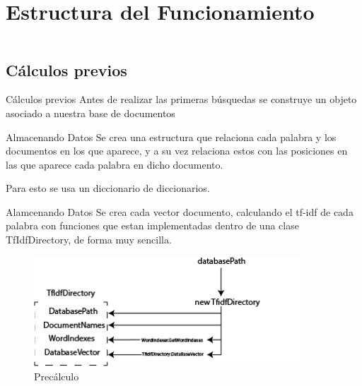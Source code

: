 \section{Estructura del Funcionamiento}
\begin{frame}
    \begin{columns}[t]
        \begin{column}{.5\textwidth}
          \tableofcontents[sections={1-2},currentsection]
        \end{column}
        \begin{column}{.5\textwidth}
          \tableofcontents[sections={3-4},currentsection]
        \end{column}
    \end{columns}
\end{frame}

\subsection{Cálculos previos}
\begin{frame}[fragile]{Cálculos previos}
  Antes de realizar las primeras búsquedas se construye un objeto asociado a nuestra base de documentos

\end{frame}
\begin{frame}[fragile]{Almacenando Datos}
Se crea una estructura que relaciona cada palabra y los documentos
en los que aparece, y a su vez relaciona estos con las posiciones en
las que aparece cada palabra en dicho documento.

\pause

Para esto se usa un diccionario de diccionarios.
\end{frame}

\begin{frame}[fragile]{Alamcenando Datos}
Se crea cada vector documento, calculando el
tf-idf de cada palabra con funciones que estan implementadas dentro de una
clase TfIdfDirectory, de forma muy sencilla.
\pause

\begin{figure}[h]
    \center
    \includegraphics[width=10cm]{RepresentacionDelPreCalculo.png}
    \caption{Precálculo}
\end{figure}

\end{frame}

